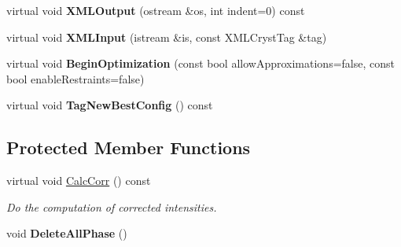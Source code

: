 \begin{DoxyCompactItemize}
virtual void {\bfseries X\+M\+L\+Output} (ostream \&os, int indent=0) const
\item 
\mbox{\label{class_obj_cryst_1_1_texture_march_dollase_ad67d0da47f03593dfe798e71a246846f}} 
virtual void {\bfseries X\+M\+L\+Input} (istream \&is, const X\+M\+L\+Cryst\+Tag \&tag)
\item 
\mbox{\label{class_obj_cryst_1_1_texture_march_dollase_a11006ace7066f2193625e765833ec30d}} 
virtual void {\bfseries Begin\+Optimization} (const bool allow\+Approximations=false, const bool enable\+Restraints=false)
\item 
\mbox{\label{class_obj_cryst_1_1_texture_march_dollase_a691e3b63dbf73f69ba0db9d85ed24c05}} 
virtual void {\bfseries Tag\+New\+Best\+Config} () const
\end{DoxyCompactItemize}
\subsection*{Protected Member Functions}
\begin{DoxyCompactItemize}
\item 
\mbox{\label{class_obj_cryst_1_1_texture_march_dollase_a4d1b16a4955a3658dc86b0fa64186467}} 
virtual void \mbox{\hyperlink{class_obj_cryst_1_1_texture_march_dollase_a4d1b16a4955a3658dc86b0fa64186467}{Calc\+Corr}} () const
\begin{DoxyCompactList}\small\item\em Do the computation of corrected intensities. \end{DoxyCompactList}\item 
\mbox{\label{class_obj_cryst_1_1_texture_march_dollase_a2c81cc2848f052c2900d135631a7e5ba}} 
void {\bfseries Delete\+All\+Phase} ()
\end{DoxyCompactItemize}
